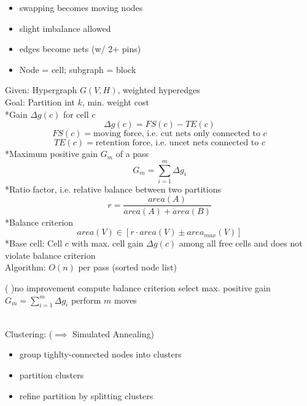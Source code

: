\begin{itemize}
  \item swapping becomes moving nodes
  \item slight imbalance allowed
  \item edges become nets (w/ 2+ pins)
  \item Node = cell; subgraph = block
\end{itemize}
Given: Hypergraph $G(V,H)$, weighted hyperedges\\
Goal: Partition int $k$, min. weight cost\\
*Gain $\Delta g(c)$ for cell $c$
$$ \Delta g(c) = FS(c) - TE(c) $$
$$ FS(c) = \text{moving force, i.e. cut nets only connected to $c$} $$
$$ TE(c) = \text{retention force, i.e. uncet nets connected to $c$} $$
*Maximum positive gain $G_m$ of a pass
$$ G_m = \sum_{i=1}^{m} \Delta g_i $$
*Ratio factor, i.e. relative balance between two partitions
$$ r = \frac{area(A)}{area(A)+area(B)} $$
*Balance criterion  
$$ area(V) \in [ r \cdot area(V) \pm area_{max}(V) ] $$
*Base cell: Cell $c$ with max. cell gain $\Delta g(c)$ among all free cells
and does not violate balance criterion\\
Algorithm: $O(n)$ per pass \quad(sorted node list)\\
\begin{algorithm}[H]
  \Repeat( ){no improvement}{
    compute balance criterion\;
    select max. positive gain $G_m = \sum_{i=1}^{m} \Delta g_i$\;
    perform $m$ moves\;
  }
\end{algorithm}

\\
Clustering: ($\implies$ Simulated Annealing)
\begin{itemize}
  \item group tighlty-connected nodes into clusters
  \item partition clusters
  \item refine partition by splitting clusters
\end{itemize}
